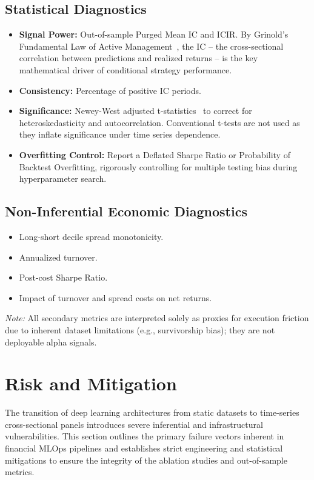 \subsection*{Statistical Diagnostics}
\begin{itemize}
    \item \textbf{Signal Power:} Out-of-sample Purged Mean \ac{IC} and \ac{ICIR}. By Grinold's Fundamental Law of Active Management~\cite{Grinold1989}, the IC -- the cross-sectional correlation between predictions and realized returns -- is the key mathematical driver of conditional strategy performance.
    \item \textbf{Consistency:} Percentage of positive IC periods.
    \item \textbf{Significance:} Newey-West adjusted t-statistics~\cite{NeweyWest1987} to correct for heteroskedasticity and autocorrelation. Conventional t-tests are not used as they inflate significance under time series dependence.
    \item \textbf{Overfitting Control:} Report a Deflated Sharpe Ratio or Probability of Backtest Overfitting, rigorously controlling for multiple testing bias during hyperparameter search.
\end{itemize}

\subsection*{Non-Inferential Economic Diagnostics}
\begin{itemize}
    \item Long-short decile spread monotonicity.
    \item Annualized turnover.
    \item Post-cost Sharpe Ratio.
    \item Impact of turnover and spread costs on net returns.
\end{itemize}

\textit{Note:} All secondary metrics are interpreted solely as proxies for execution friction due to inherent dataset limitations (e.g., survivorship bias); they are not deployable alpha signals.

\section{Risk and Mitigation}

The transition of deep learning architectures from static datasets to time-series cross-sectional panels introduces severe inferential and infrastructural vulnerabilities. This section outlines the primary failure vectors inherent in financial MLOps pipelines and establishes strict engineering and statistical mitigations to ensure the integrity of the ablation studies and out-of-sample metrics.

